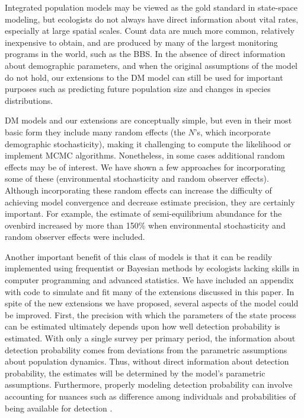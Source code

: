 \documentclass[12pt]{article}
\begin{document}

Integrated population models may be viewed as the gold standard in
state-space modeling, but ecologists do not always have direct
information about vital rates, especially at large spatial scales.
Count data are much more common, relatively inexpensive to obtain, and
are produced by many of the largest monitoring programs in the
world, such as the BBS. %
In the absence of direct information about demographic parameters, and
when the original assumptions of the model do not hold, our extensions to the
DM model can still be used for important purposes such as predicting future
population size and changes in species distributions.

DM models and our extensions are conceptually simple, but even in
their most basic form they include many random effects (the $N$'s, which
incorporate demographic stochasticity), making it challenging to compute the likelihood 
or implement MCMC algorithms. Nonetheless, in some cases additional random effects
may be of interest.  We have shown a few approaches for incorporating some of these
(environmental stochasticity and random observer effects).  %
Although incorporating these random effects can increase
the difficulty of achieving model convergence and decrease estimate precision, they are certainly important.
For example, the estimate of semi-equilibrium abundance for the ovenbird increased by more than 150\%
when environmental stochasticity and random observer effects were included.  

Another important benefit of this class of models is that it can be
readily implemented using frequentist or Bayesian methods by
ecologists lacking skills in computer programming and advanced
statistics. We have included an appendix with code to
simulate and fit many of the extensions discussed in this paper.
In spite of the new extensions we have proposed, several aspects of
the model could be improved. First, the precision with which the
parameters of the state process can be estimated ultimately depends
upon how well detection probability is estimated. With
only a single survey per primary period, the information about
detection probability comes from deviations from the parametric
assumptions about population dynamics. Thus, without direct information
about detection probability, the estimates will be determined by the
model's parametric assumptions. Furthermore, properly modeling detection
probability can involve accounting for nuances such as difference
among individuals and probabilities of being available for detection
\citep{nichols_etal:2009}.
\end{document}
